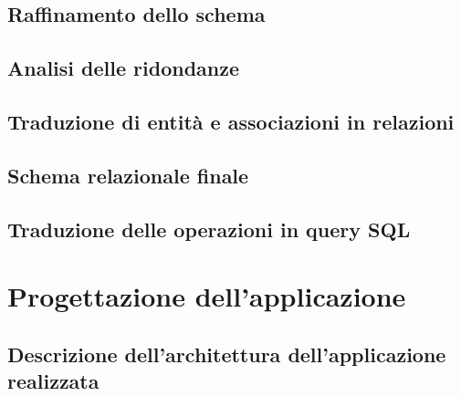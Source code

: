 \documentclass[a4paper,12pt, oneside]{article}
\begin{document}
\subsection{Raffinamento dello schema}
\subsection{Analisi delle ridondanze}
\subsection{Traduzione di entità e associazioni in relazioni}
\subsection{Schema relazionale finale}
\subsection{Traduzione delle operazioni in query SQL}

\section{Progettazione dell'applicazione}
\subsection{Descrizione dell'architettura dell'applicazione realizzata}
\end{document}
